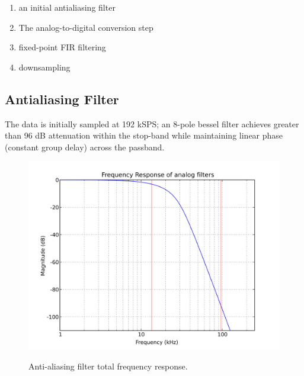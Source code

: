 \begin{enumerate}
\item an initial antialiasing filter
\item The analog-to-digital conversion step
\item fixed-point FIR filtering
\item downsampling
\end{enumerate}

\subsection{Antialiasing Filter}
The data is initially sampled at 192 kSPS; an 8-pole bessel filter
achieves greater than 96 dB attenuation within the stop-band while
maintaining linear phase (constant group delay) across the passband.

\begin{figure}[h!]
  \includegraphics[scale=1.0]{soma-1.analog.freqres.svg}
  \label{analog.freqres}
  \caption{Anti-aliasing filter total frequency response.}
\end{figure}

